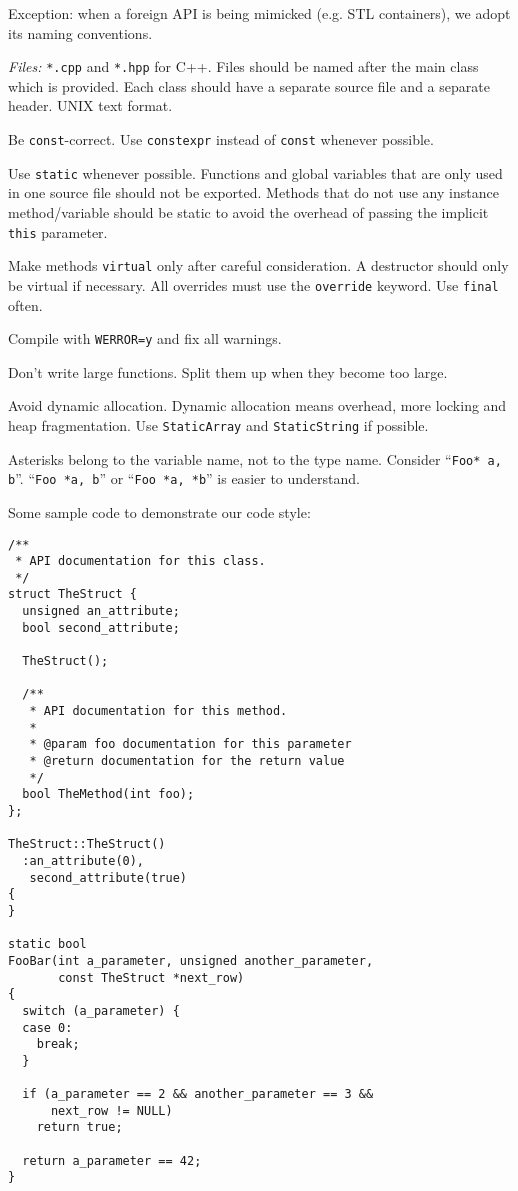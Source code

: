 \documentclass[a4paper,12pt]{refrep}
\begin{document}
Exception: when a foreign API is being mimicked (e.g. STL containers),
we adopt its naming conventions.

\emph{Files:} \texttt{*.cpp} and \texttt{*.hpp} for C++.  Files should
be named after the main class which is provided.  Each class should
have a separate source file and a separate header.  UNIX text format.

Be \texttt{const}-correct.  Use \verb|constexpr| instead of
\verb|const| whenever possible.

Use \verb|static| whenever possible.  Functions and global variables
that are only used in one source file should not be exported.  Methods
that do not use any instance method/variable should be static to avoid
the overhead of passing the implicit \verb|this| parameter.

Make methods \verb|virtual| only after careful consideration.  A
destructor should only be virtual if necessary.  All overrides must
use the \verb|override| keyword.  Use \verb|final| often.

Compile with \texttt{WERROR=y} and fix all warnings.

Don't write large functions.  Split them up when they become too
large.

Avoid dynamic allocation.  Dynamic allocation means overhead, more
locking and heap fragmentation.  Use \texttt{StaticArray} and
\texttt{StaticString} if possible.

Asterisks belong to the variable name, not to the type name.  Consider
``\texttt{Foo* a, b}''.  ``\texttt{Foo *a, b}'' or ``\texttt{Foo *a,
  *b}'' is easier to understand.

Some sample code to demonstrate our code style:

\begin{verbatim}
/**
 * API documentation for this class.
 */
struct TheStruct {
  unsigned an_attribute;
  bool second_attribute;

  TheStruct();

  /**
   * API documentation for this method.
   *
   * @param foo documentation for this parameter
   * @return documentation for the return value
   */
  bool TheMethod(int foo);
};

TheStruct::TheStruct()
  :an_attribute(0),
   second_attribute(true)
{
}

static bool
FooBar(int a_parameter, unsigned another_parameter,
       const TheStruct *next_row)
{
  switch (a_parameter) {
  case 0:
    break;
  }

  if (a_parameter == 2 && another_parameter == 3 &&
      next_row != NULL)
    return true;

  return a_parameter == 42;
}
\end{verbatim}
\end{document}
